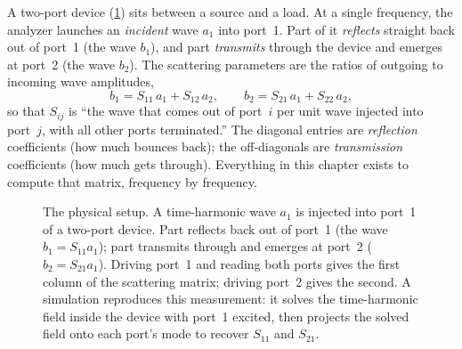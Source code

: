 \begin{physicsbox}
A two-port device (\cref{fig:setup}) sits between a source and a load. At a single
frequency, the analyzer launches an \emph{incident} wave $a_1$ into port~1. Part
of it \emph{reflects} straight back out of port~1 (the wave $b_1$), and part
\emph{transmits} through the device and emerges at port~2 (the wave $b_2$). The
scattering parameters are the ratios of outgoing to incoming wave amplitudes,
\[
  b_1 = S_{11}\,a_1 + S_{12}\,a_2, \qquad
  b_2 = S_{21}\,a_1 + S_{22}\,a_2,
\]
so that $S_{ij}$ is ``the wave that comes out of port~$i$ per unit wave injected
into port~$j$, with all other ports terminated.'' The diagonal entries are
\emph{reflection} coefficients (how much bounces back); the off-diagonals are
\emph{transmission} coefficients (how much gets through). Everything in this
chapter exists to compute that matrix, frequency by frequency.
\end{physicsbox}

\begin{figure}[t]
\centering
{}
\caption[A two-port device and its scattering waves]{The physical setup. A
time-harmonic wave $a_1$ is injected into port~1 of a two-port device. Part
reflects back out of port~1 (the wave $b_1 = S_{11}a_1$); part transmits through
and emerges at port~2 ($b_2 = S_{21}a_1$). Driving port~1 and reading both ports
gives the first column of the scattering matrix; driving port~2 gives the second.
A simulation reproduces this measurement: it solves the time-harmonic field
inside the device with port~1 excited, then projects the solved field onto each
port's mode to recover $S_{11}$ and $S_{21}$.}
\label{fig:setup}
\end{figure}

